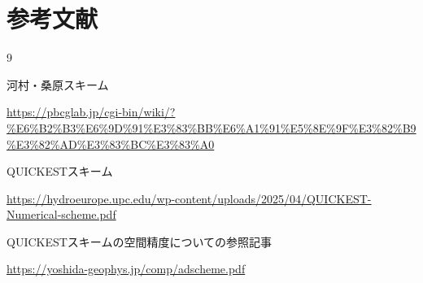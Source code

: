 \documentclass[ja=standard,xelatex]{bxjsarticle}
\begin{document}
\newpage
\section{参考文献}
\begin{thebibliography}{9}

河村・桑原スキーム

\url{https://pbcglab.jp/cgi-bin/wiki/?\%E6\%B2\%B3\%E6\%9D\%91\%E3\%83\%BB\%E6\%A1\%91\%E5\%8E\%9F\%E3\%82\%B9\%E3\%82\%AD\%E3\%83\%BC\%E3\%83\%A0}

QUICKESTスキーム

\url{https://hydroeurope.upc.edu/wp-content/uploads/2025/04/QUICKEST-Numerical-scheme.pdf}

QUICKESTスキームの空間精度についての参照記事

\url{https://yoshida-geophys.jp/comp/adscheme.pdf}

\end{thebibliography}
\end{document}

